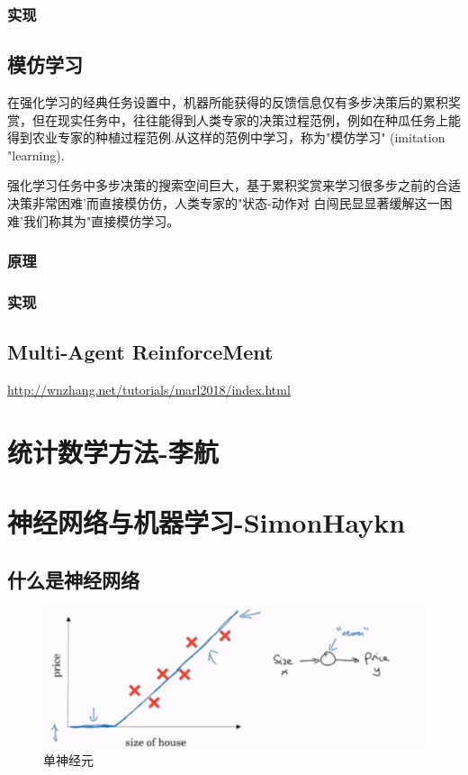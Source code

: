 \documentclass[UTF8,a4paper,12pt]{ctexbook}
\begin{document}
		\subsection{实现}
		
					
	\section{模仿学习}
		在强化学习的经典任务设置中，机器所能获得的反馈信息仅有多步决策后的累积奖赏，但在现实任务中，往往能得到人类专家的决策过程范例，例如在种瓜任务上能得到农业专家的种植过程范例.从这样的范例中学习，称为"模仿学习" (imitation "learning).	
		
		强化学习任务中多步决策的搜索空间巨大，基于累积奖赏来学习很多步之前的合适决策非常困难'而直接模仿仿，人类专家的"状态-动作对 白闯民显显著缓解这一困难'我们称其为"直接模仿学习。
		
		\subsection{原理}
		
		\subsection{实现}
	
	
	
	\section{Multi-Agent  ReinforceMent}
		\url{http://wnzhang.net/tutorials/marl2018/index.html}
		
		
						
\chapter{统计数学方法-李航}


\chapter{神经网络与机器学习-SimonHaykn}
	\section{什么是神经网络}
		\begin{figure}[H]
			\centering
			\includegraphics[width=\linewidth]{Neuron}
			\caption{单神经元}
		\end{figure}
	
\end{document}
